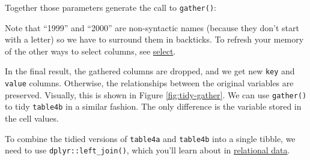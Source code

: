 \documentclass[]{book}
\newenvironment{Shaded}{\begin{snugshade}}{\end{snugshade}}
\newcommand{\KeywordTok}[1]{\textcolor[rgb]{0.13,0.29,0.53}{\textbf{#1}}}
\newcommand{\DataTypeTok}[1]{\textcolor[rgb]{0.13,0.29,0.53}{#1}}
\newcommand{\StringTok}[1]{\textcolor[rgb]{0.31,0.60,0.02}{#1}}
\newcommand{\CommentTok}[1]{\textcolor[rgb]{0.56,0.35,0.01}{\textit{#1}}}
\newcommand{\OperatorTok}[1]{\textcolor[rgb]{0.81,0.36,0.00}{\textbf{#1}}}
\newcommand{\NormalTok}[1]{#1}
\theoremstyle{definition}
\theoremstyle{definition}
\theoremstyle{definition}
\theoremstyle{remark}
\let\BeginKnitrBlock\begin \let\EndKnitrBlock\end
\begin{document}
Together those parameters generate the call to \texttt{gather()}:

\begin{Shaded}
\end{Shaded}

\BeginKnitrBlock{rmdimportant}
Note that ``1999'' and ``2000'' are non-syntactic names (because they
don't start with a letter) so we have to surround them in backticks. To
refresh your memory of the other ways to select columns, see
\protect\hyperlink{select}{select}.
\EndKnitrBlock{rmdimportant}

In the final result, the gathered columns are dropped, and we get new
\texttt{key} and \texttt{value} columns. Otherwise, the relationships
between the original variables are preserved. Visually, this is shown in
Figure \ref{fig:tidy-gather}. We can use \texttt{gather()} to tidy
\texttt{table4b} in a similar fashion. The only difference is the
variable stored in the cell values.

To combine the tidied versions of \texttt{table4a} and \texttt{table4b}
into a single tibble, we need to use \texttt{dplyr::left\_join()}, which
you'll learn about in \protect\hyperlink{relational-data}{relational
data}.
\end{document}
